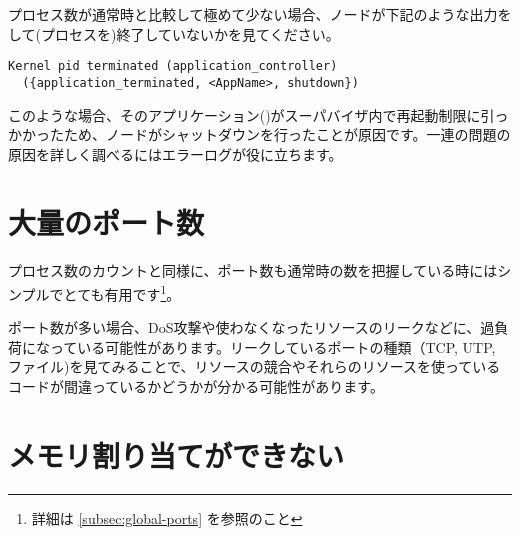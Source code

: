 プロセス数が通常時と比較して極めて少ない場合、ノードが下記のような出力をして(プロセスを)終了していないかを見てください。

\begin{Verbatim}
Kernel pid terminated (application_controller)
  ({application_terminated, <AppName>, shutdown})
\end{Verbatim}

このような場合、そのアプリケーション()がスーパバイザ内で再起動制限に引っかかったため、ノードがシャットダウンを行ったことが原因です。一連の問題の原因を詳しく調べるにはエラーログが役に立ちます。


\section{大量のポート数}

プロセス数のカウントと同様に、ポート数も通常時の数を把握している時にはシンプルでとても有用です\footnote{詳細は \ref{subsec:global-ports}  を参照のこと}。

ポート数が多い場合、DoS攻撃や使わなくなったリソースのリークなどに、過負荷になっている可能性があります。リークしているポートの種類（TCP, UTP, ファイル)を見てみることで、リソースの競合やそれらのリソースを使っているコードが間違っているかどうかが分かる可能性があります。

\section{メモリ割り当てができない}

